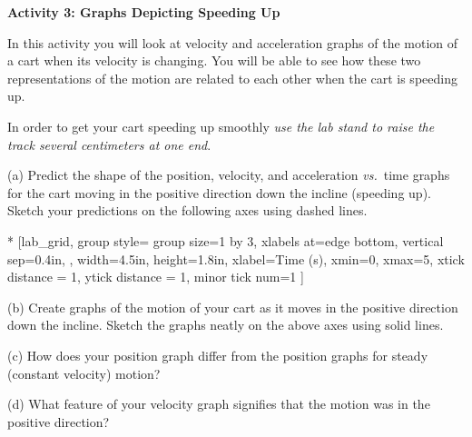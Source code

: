 \pagebreak[2]
\textbf{Activity 3: Graphs Depicting Speeding Up} 

In this activity you will look at velocity and acceleration graphs of the
motion of a cart when its velocity is changing. You will be able to see how
these two representations of the motion are related to each other when the cart
is speeding up.

In order to get your cart speeding up smoothly \textit{use the lab stand to raise the
track several centimeters at one end}.

(a) Predict the shape of the position, velocity, and acceleration \textit{vs.}~time graphs
for the cart moving in the positive direction down the incline (speeding up). Sketch your predictions on the following axes using dashed lines.



\begin{lab_groupplot}*{}
					[lab_grid,
	group style={
		group size=1 by 3,
		xlabels at=edge bottom,
		vertical sep=0.4in,
		},
	width=4.5in,  height=1.8in,
	xlabel=Time (s),
	xmin=0, xmax=5,
	xtick distance = 1, 
	ytick distance = 1, 
	minor tick num=1
	]
\nextgroupplot[
	ymin=0,ymax=2, 
	ylabel={Position (m)},
	ylabel_align={-1},
	]
\nextgroupplot[
	ymin=-1,ymax=1, 
	ylabel={Velocity (m/s)},
	]
\nextgroupplot[
	ymin=-1,ymax=1, 
	ylabel={Acceleration (m/s$^2$)},
	]
\end{lab_groupplot}

(b) Create graphs of the motion of your cart as it moves in the positive direction down the incline. Sketch the graphs neatly on the above axes using solid lines.

\pagebreak[2]
(c) How does your position graph differ from the position graphs for steady
(constant velocity) motion? 
\vspace{13mm}

(d) What feature of your velocity graph signifies that the motion was in the positive direction? 
\vspace{13mm}

